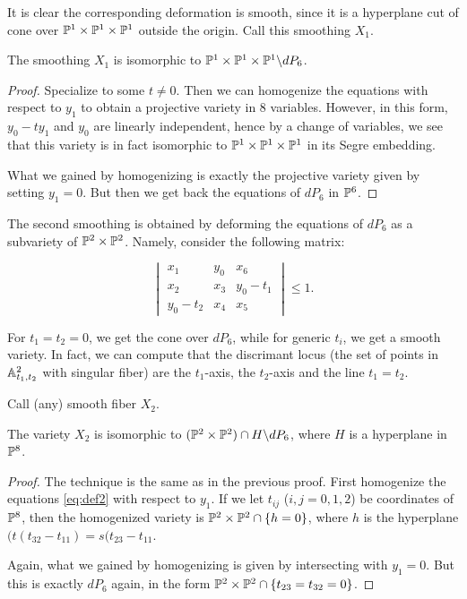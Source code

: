 \documentclass[]{uiophd}
\begin{document}
It is clear the corresponding deformation is smooth, since it is a hyperplane cut of cone over $\mathbb{P}^1 \times \mathbb{P}^1 \times \mathbb{P}^1$ outside the origin. Call this smoothing $X_1$.

\begin{lemma}
The smoothing $X_1$ is isomorphic to $\mathbb{P}^1 \times \mathbb{P}^1 \times \mathbb{P}^1 \backslash dP_6$.
\end{lemma}
\begin{proof}
Specialize to some $t \neq 0$. Then we can homogenize the equations with respect to $y_1$ to obtain a projective variety in $8$ variables. However, in this form, $y_0-ty_1$ and $y_0$ are linearly independent, hence by a change of variables, we see that this variety is in fact isomorphic to $\mathbb{P}^1 \times \mathbb{P}^1 \times \mathbb{P}^1$ in its Segre embedding.

What we gained by homogenizing is exactly the projective variety given by setting $y_1=0$. But then we get back the equations of $dP_6$ in $\mathbb{P}^6$.
\end{proof}

The second smoothing is obtained by deforming the equations of $dP_6$ as a subvariety of $\mathbb{P}^2 \times \mathbb{P}^2$. Namely, consider the following matrix:

\begin{equation}
\label{eq:def2}
\begin{vmatrix}
x_1 & y_0 & x_6 \\
x_2 & x_3 & y_0-t_1 \\
y_0-t_2 & x_4 & x_5
\end{vmatrix} \leq 1.
\end{equation}


For $t_1=t_2=0$, we get the cone over $dP_6$, while for generic $t_i$, we get a smooth variety. In fact, we can compute that the discrimant locus (the set of points in $\mathbb{A}^2_{t_1,t_2}$ with singular fiber) are the $t_1$-axis, the $t_2$-axis and the line $t_1=t_2$. 

Call (any) smooth fiber $X_2$. 

\begin{lemma}
The variety $X_2$ is isomorphic to $(\mathbb{P}^2 \times \mathbb{P}^2) \cap H \backslash dP_6$, where $H$ is a hyperplane in $\mathbb{P}^8$.
\end{lemma}
\begin{proof}
The technique is the same as in the previous proof. First homogenize the equations \eqref{eq:def2} with respect to $y_1$. If we let $t_{ij}$ ($i,j=0,1,2$) be coordinates of $\mathbb{P}^8$, then the homogenized variety is $\mathbb{P}^2 \times \mathbb{P}^2 \cap \{h = 0\}$, where $h$ is the hyperplane $(t(t_{32}-t_{11})=s(t_{23}-t_{11}$.

Again, what we gained by homogenizing is given by intersecting with $y_1=0$. But this is exactly $dP_6$ again, in the form $\mathbb{P}^2 \times \mathbb{P}^2 \cap \{ t_{23}=t_{32}=0 \}$. 
\end{proof}
\end{document}
